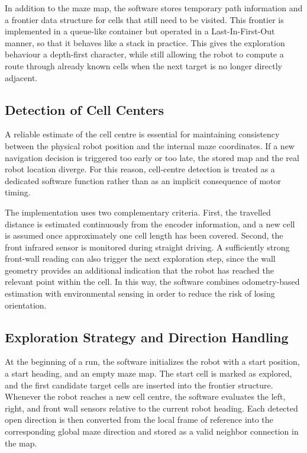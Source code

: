 In addition to the maze map, the software stores temporary path information and a frontier data structure for cells that still need to be visited. This frontier is implemented in a queue-like container but operated in a Last-In-First-Out manner, so that it behaves like a stack in practice. This gives the exploration behaviour a depth-first character, while still allowing the robot to compute a route through already known cells when the next target is no longer directly adjacent.

\subsection{Detection of Cell Centers}

A reliable estimate of the cell centre is essential for maintaining consistency between the physical robot position and the internal maze coordinates. If a new navigation decision is triggered too early or too late, the stored map and the real robot location diverge. For this reason, cell-centre detection is treated as a dedicated software function rather than as an implicit consequence of motor timing.

The implementation uses two complementary criteria. First, the travelled distance is estimated continuously from the encoder information, and a new cell is assumed once approximately one cell length has been covered. Second, the front infrared sensor is monitored during straight driving. A sufficiently strong front-wall reading can also trigger the next exploration step, since the wall geometry provides an additional indication that the robot has reached the relevant point within the cell. In this way, the software combines odometry-based estimation with environmental sensing in order to reduce the risk of losing orientation.

\subsection{Exploration Strategy and Direction Handling}

At the beginning of a run, the software initializes the robot with a start position, a start heading, and an empty maze map. The start cell is marked as explored, and the first candidate target cells are inserted into the frontier structure. Whenever the robot reaches a new cell centre, the software evaluates the left, right, and front wall sensors relative to the current robot heading. Each detected open direction is then converted from the local frame of reference into the corresponding global maze direction and stored as a valid neighbor connection in the map.


